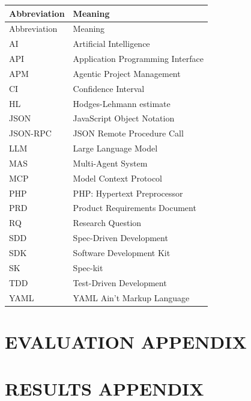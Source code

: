 \documentclass[ack]{apmthesis}
\begin{document}
\begin{longtable}{@{}l@{\hspace{2em}}p{}@{}}
  \toprule
  Abbreviation & Meaning \\
  \midrule
  \endfirsthead
  \toprule
  Abbreviation & Meaning \\
  \midrule
  \endhead
  \bottomrule
  \endlastfoot
  AI       & Artificial Intelligence \\
  API      & Application Programming Interface \\
  APM      & Agentic Project Management \\
  CI       & Confidence Interval \\
  HL       & Hodges-Lehmann estimate \\
  JSON     & JavaScript Object Notation \\
  JSON-RPC & JSON Remote Procedure Call \\
  LLM      & Large Language Model \\
  MAS      & Multi-Agent System \\
  MCP      & Model Context Protocol \\
  PHP      & PHP: Hypertext Preprocessor \\
  PRD      & Product Requirements Document \\
  RQ       & Research Question \\
  SDD      & Spec-Driven Development \\
  SDK      & Software Development Kit \\
  SK       & Spec-kit \\
  TDD      & Test-Driven Development \\
  YAML     & YAML Ain't Markup Language \\
\end{longtable}

\begin{appendix}
\appendixstartedtrue
{}
{}

\chapter{EVALUATION APPENDIX}


\chapter{RESULTS APPENDIX}

\end{appendix}

\printbibliography[title={BIBLIOGRAPHY}]
\end{document}
